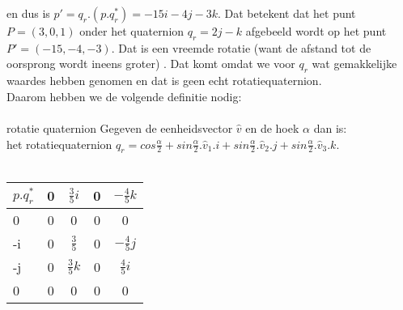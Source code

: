 en dus is $ p' = q_r.(p.q^*_r) =  -15i -4j -3k. $ Dat betekent dat het punt $ P = (3,0,1) $  onder het quaternion  $ q_r = 2j-k $ afgebeeld wordt op het punt $ P' = (-15, -4, -3). $ Dat is een vreemde rotatie (want de afstand tot de oorsprong wordt ineens groter) . Dat komt omdat we voor $ q_r $ wat gemakkelijke waardes hebben genomen en dat is geen echt rotatiequaternion.\\
Daarom hebben we de volgende definitie nodig:\\ \\
\mydef
{rotatie quaternion}
{Gegeven de eenheidsvector $\hat{v} $  en de  hoek $\alpha $ dan is:\\
	het rotatiequaternion \quad	
	$ q_r = cos\frac{\alpha}{2} + sin\frac{\alpha}{2} .\hat{v}_1.i
	+ sin\frac{\alpha}{2} .\hat{v}_2.j + sin\frac{\alpha}{2} .\hat{v}_3.k $.	    
}\\
\\
\begin{center}
	\begin{tabular}{ | l || c | c |c |c |}
		\hline
		$ p.q^*_r $  & 0 & $  \frac{3}{5}i  $  & 0 & $ - \frac{4}{5}k $  \\ \hline \hline
		0                 & 0 & 0                          & 0    & 0  \\ \hline
		-i                & 0 &  $  \frac{3}{5}  $  & 0   & $ - \frac{4}{5}j $\\ \hline
		-j                & 0 &  $  \frac{3}{5}k $  & 0     & $  \frac{4}{5}i $\\ \hline
		0                 & 0 & 0                          & 0   & 0 \\
		\hline 
	\end{tabular}
\end{center}
